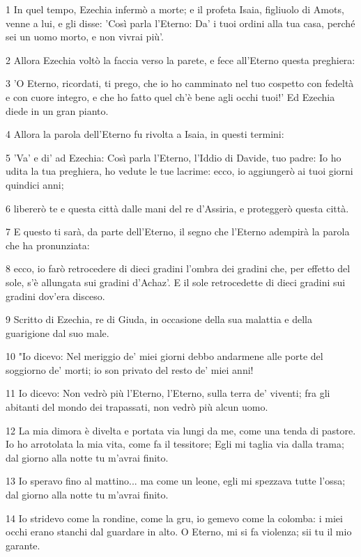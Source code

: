 \par 1 In quel tempo, Ezechia infermò a morte; e il profeta Isaia, figliuolo di Amots, venne a lui, e gli disse: 'Così parla l'Eterno: Da' i tuoi ordini alla tua casa, perché sei un uomo morto, e non vivrai più'.
\par 2 Allora Ezechia voltò la faccia verso la parete, e fece all'Eterno questa preghiera:
\par 3 'O Eterno, ricordati, ti prego, che io ho camminato nel tuo cospetto con fedeltà e con cuore integro, e che ho fatto quel ch'è bene agli occhi tuoi!' Ed Ezechia diede in un gran pianto.
\par 4 Allora la parola dell'Eterno fu rivolta a Isaia, in questi termini:
\par 5 'Va' e di' ad Ezechia: Così parla l'Eterno, l'Iddio di Davide, tuo padre: Io ho udita la tua preghiera, ho vedute le tue lacrime: ecco, io aggiungerò ai tuoi giorni quindici anni;
\par 6 libererò te e questa città dalle mani del re d'Assiria, e proteggerò questa città.
\par 7 E questo ti sarà, da parte dell'Eterno, il segno che l'Eterno adempirà la parola che ha pronunziata:
\par 8 ecco, io farò retrocedere di dieci gradini l'ombra dei gradini che, per effetto del sole, s'è allungata sui gradini d'Achaz'. E il sole retrocedette di dieci gradini sui gradini dov'era disceso.
\par 9 Scritto di Ezechia, re di Giuda, in occasione della sua malattia e della guarigione dal suo male.
\par 10 "Io dicevo: Nel meriggio de' miei giorni debbo andarmene alle porte del soggiorno de' morti; io son privato del resto de' miei anni!
\par 11 Io dicevo: Non vedrò più l'Eterno, l'Eterno, sulla terra de' viventi; fra gli abitanti del mondo dei trapassati, non vedrò più alcun uomo.
\par 12 La mia dimora è divelta e portata via lungi da me, come una tenda di pastore. Io ho arrotolata la mia vita, come fa il tessitore; Egli mi taglia via dalla trama; dal giorno alla notte tu m'avrai finito.
\par 13 Io speravo fino al mattino... ma come un leone, egli mi spezzava tutte l'ossa; dal giorno alla notte tu m'avrai finito.
\par 14 Io stridevo come la rondine, come la gru, io gemevo come la colomba: i miei occhi erano stanchi dal guardare in alto. O Eterno, mi si fa violenza; sii tu il mio garante.
